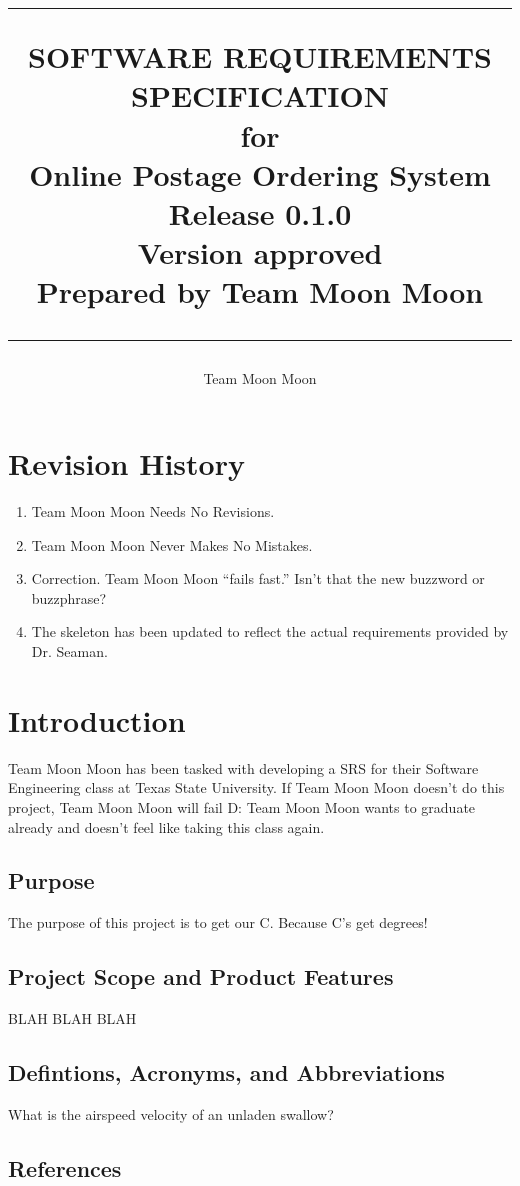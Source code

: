 \documentclass{scrreprt}
\title{%
\flushright
\rule{16cm}{5pt}\vskip1cm
\Huge{SOFTWARE REQUIREMENTS\\ SPECIFICATION}\\
\vspace{2cm}
for\\
\vspace{2cm}
Online Postage Ordering System\\
\vspace{2cm}
\LARGE{Release 0.1.0\\}
\vspace{2cm}
\LARGE{Version \myversion approved\\}
\vspace{2cm}
Prepared by Team Moon Moon\\
\vfill
\rule{16cm}{5pt}
}
\date{}
\author{Team Moon Moon}
\begin{document}
\maketitle
\tableofcontents

\chapter*{Revision History}

\begin{enumerate}
\item Team Moon Moon Needs No Revisions.
\item Team Moon Moon Never Makes No Mistakes.
\item Correction. Team Moon Moon ``fails fast.'' Isn't that the new 
buzzword or buzzphrase?
\item The skeleton has been updated to reflect the actual requirements 
provided by Dr. Seaman.
\end{enumerate}

\chapter{Introduction}

Team Moon Moon has been tasked with developing a SRS for their Software 
Engineering class at Texas State University. If Team Moon Moon doesn't do 
this project, Team Moon Moon will fail D: Team Moon Moon wants to 
graduate already and doesn't feel like taking this class again.

\section{Purpose}

The purpose of this project is to get our C. Because C's get degrees!

\section{Project Scope and Product Features}

BLAH BLAH BLAH

\section{Defintions, Acronyms, and Abbreviations}

What is the airspeed velocity of an unladen swallow?

\section{References}
\end{document}
